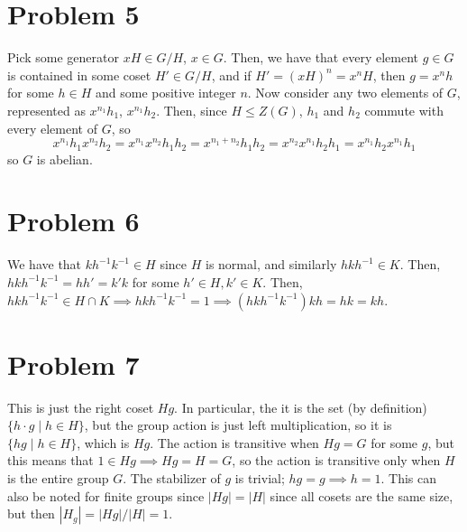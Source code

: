 \documentclass[12pt,letterpaper]{article}
\theoremstyle{definition}
\begin{document}
\section*{Problem 5}

Pick some generator $xH \in G/H$, $x \in G$. Then, we have that every element $g \in G$ is contained in some coset $H' \in G/H$, and if $H' = (xH)^{n} = x^{n}H$, then $g = x^{n}h$ for some $h \in H$ and some positive integer $n$. Now consider any two elements of $G$, represented as $x^{n_{1}}h_{1}$, $x^{n_{1}}h_{2}$. Then, since $H \leq Z(G)$, $h_{1}$ and $h_{2}$ commute with every element of $G$, so
\[
  x^{n_{1}}h_{1}x^{n_{2}}h_{2} = x^{n_{1}}x^{n_{2}}h_{1}h_{2} = x^{n_{1} + n_{2}}h_{1}h_{2} = x^{n_{2}}x^{n_{1}}h_{2}h_{1} = x^{n_{1}}h_{2}x^{n_{1}}h_{1}
\]
so $G$ is abelian.

\section*{Problem 6}

We have that $kh^{-1}k^{-1} \in H$ since $H$ is normal, and similarly $hkh^{-1} \in K$. Then, $hkh^{-1}k^{-1} = hh' = k'k$ for some $h' \in H, k' \in K$. Then, $hkh^{-1}k^{-1} \in H \cap K \implies hkh^{-1}k^{-1} = 1 \implies (hkh^{-1}k^{-1})kh = hk = kh$.

\section*{Problem 7}

This is just the right coset $Hg$. In particular, the it is the set (by definition) $\{h \cdot g \mid h \in H\}$, but the group action is just left multiplication, so it is $\{hg \mid h \in H\}$, which is $Hg$. The action is transitive when $Hg = G$ for some $g$, but this means that $1 \in Hg \implies Hg = H = G$, so the action is transitive only when $H$ is the entire group $G$. The stabilizer of $g$ is trivial; $hg = g \implies h = 1$. This can also be noted for finite groups since $|Hg| = |H|$ since all cosets are the same size, but then $|H_{g}| = |Hg|/|H| =1$.
\end{document}
